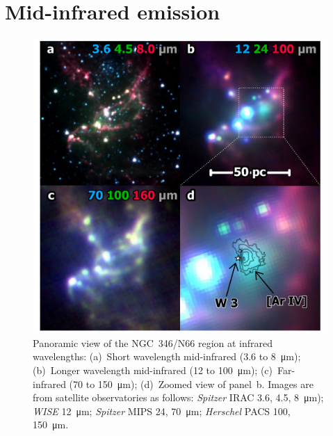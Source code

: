 \documentclass[twocolumn, times]{aastex631}
\begin{document}
\section{Mid-infrared emission}
\label{sec:mid-infr-emiss}


\begin{figure}
  \centering
  \includegraphics[width=\linewidth]{figs/ngc346-infrared-multipanel}
  \caption{
    Panoramic view of the NGC~346/N66 region at infrared wavelengths:
    (a)~Short wavelength mid-infrared (\num{3.6} to \SI{8}{\um});
    (b)~Longer wavelength mid-infrared (\num{12} to \SI{100}{\um});
    (c)~Far-infrared (\num{70} to \SI{150}{\um});
    (d)~Zoomed view of panel~b.
    Images are from satellite observatories as follows:
    \textit{Spitzer} IRAC \num{3.6}, \num{4.5}, \SI{8}{\um});
    \textit{WISE} \SI{12}{\um};
    \textit{Spitzer} MIPS \num{24}, \SI{70}{\um};
    \textit{Herschel} PACS \num{100}, \SI{150}{\um}.
    }
  \label{fig:infrared-multipanel}
\end{figure}
\end{document}
